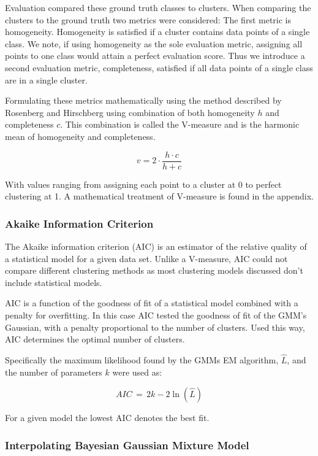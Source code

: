 \documentclass[a4paper,11pt]{article}
\begin{document}
Evaluation compared these ground truth classes to clusters. When comparing the clusters to the ground truth two metrics were considered: The first metric is homogeneity. Homogeneity is satisfied if a cluster contains data points of a single class. We note, if using homogeneity as the sole evaluation metric, assigning all points to one class would attain a perfect evaluation score. Thus we introduce a second evaluation metric, completeness, satisfied if all data points of a single class are in a single cluster. 

Formulating these metrics mathematically using the method described by Rosenberg and Hirschberg using combination of both homogeneity $h$ and completeness $c$. This combination is called the V-measure and is the harmonic mean of homogeneity and completeness.

\begin{equation}
v = 2 \cdot \frac{h \cdot c}{h + c}
\end{equation}

With values ranging from assigning each point to a cluster at 0 to perfect clustering at 1. A mathematical treatment of V-measure is found in the appendix.

\subsubsection{Akaike Information Criterion}

The Akaike information criterion (AIC) is an estimator of the relative quality of a statistical model for a given data set. Unlike a V-measure, AIC could not compare different clustering methods as most clustering models discussed don't include statistical models.

AIC is a function of the goodness of fit of a statistical model combined with a penalty for overfitting. In this case AIC tested the goodness of fit of the GMM's Gaussian, with a penalty proportional to the number of clusters. Used this way, AIC determines the optimal number of clusters.

Specifically the maximum likelihood found by the GMMs EM algorithm, $\hat L$, and the number of parameters $k$ were used as:

\begin{equation}
    AIC \, = \, 2k - 2\ln(\hat L)
\end{equation}

For a given model the lowest AIC denotes the best fit.

\subsubsection{Interpolating Bayesian Gaussian Mixture Model}
\end{document}
